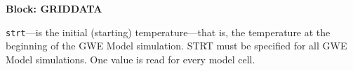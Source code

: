 
\item \textbf{Block: GRIDDATA}

\begin{description}
\item \texttt{strt}---is the initial (starting) temperature---that is, the temperature at the beginning of the GWE Model simulation.  STRT must be specified for all GWE Model simulations. One value is read for every model cell.

\end{description}

